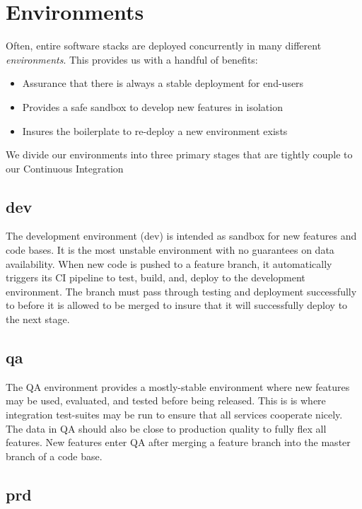 \documentclass[a4paper,12pt,titlepage]{scrartcl}
\begin{document}
	\section{Environments}
	
	Often, entire software stacks are deployed concurrently in many different {\em environments}. This provides us with a handful of benefits:
	
	\begin{itemize}  
	\item Assurance that there is always a stable deployment for end-users
	\item Provides a safe sandbox to develop new features in isolation
	\item Insures the boilerplate to re-deploy a new environment exists
	\end{itemize}
	
	We divide our environments into three primary stages that are tightly couple to our Continuous Integration
	
	\subsection{dev} \label{dev}
	
	The development environment (dev) is intended as sandbox for  new features and code bases.
	It is the most unstable environment with no guarantees on data availability.
	When new code is pushed to a feature branch, it automatically triggers its CI pipeline to test, build, and, deploy to the development environment.
	The branch must pass through testing and deployment successfully to before it is allowed to be merged to insure that it will successfully deploy to the next stage.
	
	\subsection{qa}\label{qa}
	
	The QA environment provides a mostly-stable environment where new features may be used, evaluated, and tested before being released.
	This is is where integration test-suites may be run to ensure that all services cooperate nicely.
	The data in QA should also be close to production quality to fully flex all features.
	New features enter QA after merging a feature branch into the master branch of a code base.
	
	\subsection{prd}\label{prd}
	
\end{document}
